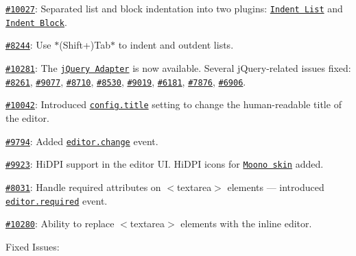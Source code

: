 {\ttfamily 
\begin{DoxyItemize}
\item \href{http://dev.ckeditor.com/ticket/10027}{\tt \#10027}\+: Separated list and block indentation into two plugins\+: \href{http://ckeditor.com/addon/indentlist}{\tt Indent List} and \href{http://ckeditor.com/addon/indentblock}{\tt Indent Block}.
\item \href{http://dev.ckeditor.com/ticket/8244}{\tt \#8244}\+: Use $\ast$(Shift+)Tab$\ast$ to indent and outdent lists.
\item \href{http://dev.ckeditor.com/ticket/10281}{\tt \#10281}\+: The \href{http://docs.ckeditor.com/#!/guide/dev_jquery}{\tt j\+Query Adapter} is now available. Several j\+Query-\/related issues fixed\+: \href{http://dev.ckeditor.com/ticket/8261}{\tt \#8261}, \href{http://dev.ckeditor.com/ticket/9077}{\tt \#9077}, \href{http://dev.ckeditor.com/ticket/8710}{\tt \#8710}, \href{http://dev.ckeditor.com/ticket/8530}{\tt \#8530}, \href{http://dev.ckeditor.com/ticket/9019}{\tt \#9019}, \href{http://dev.ckeditor.com/ticket/6181}{\tt \#6181}, \href{http://dev.ckeditor.com/ticket/7876}{\tt \#7876}, \href{http://dev.ckeditor.com/ticket/6906}{\tt \#6906}.
\item \href{http://dev.ckeditor.com/ticket/10042}{\tt \#10042}\+: Introduced \href{http://docs.ckeditor.com/#!/api/CKEDITOR.config-cfg-title}{\tt {\ttfamily config.\+title}} setting to change the human-\/readable title of the editor.
\item \href{http://dev.ckeditor.com/ticket/9794}{\tt \#9794}\+: Added \href{http://docs.ckeditor.com/#!/api/CKEDITOR.editor-event-change}{\tt {\ttfamily editor.\+change}} event.
\item \href{http://dev.ckeditor.com/ticket/9923}{\tt \#9923}\+: Hi\+D\+PI support in the editor UI. Hi\+D\+PI icons for \href{http://ckeditor.com/addon/moono}{\tt Moono skin} added.
\item \href{http://dev.ckeditor.com/ticket/8031}{\tt \#8031}\+: Handle {\ttfamily required} attributes on {\ttfamily $<$textarea$>$} elements --- introduced \href{http://docs.ckeditor.com/#!/api/CKEDITOR.editor-event-required}{\tt {\ttfamily editor.\+required}} event.
\item \href{http://dev.ckeditor.com/ticket/10280}{\tt \#10280}\+: Ability to replace {\ttfamily $<$textarea$>$} elements with the inline editor.
\end{DoxyItemize}}

{\ttfamily Fixed Issues\+:}

